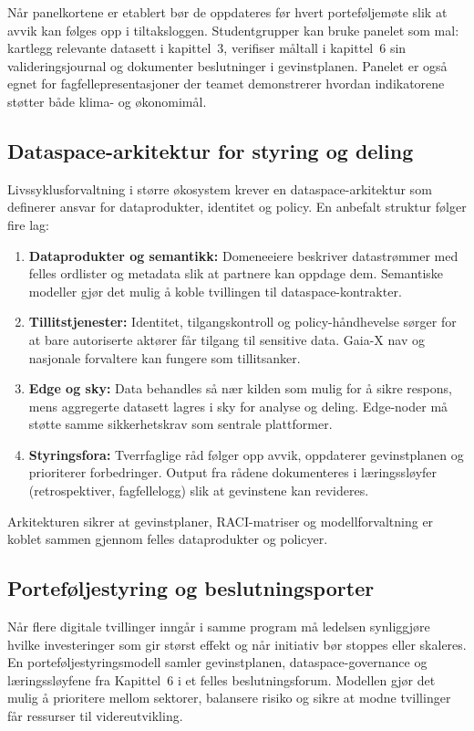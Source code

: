 Når panelkortene er etablert bør de oppdateres før hvert porteføljemøte slik at avvik kan følges opp i tiltaksloggen. Studentgrupper kan bruke panelet som mal: kartlegg relevante datasett i kapittel~3, verifiser måltall i kapittel~6 sin valideringsjournal og dokumenter beslutninger i gevinstplanen. Panelet er også egnet for fagfellepresentasjoner der teamet demonstrerer hvordan indikatorene støtter både klima- og økonomimål.

\subsection*{Dataspace-arkitektur for styring og deling}
Livssyklusforvaltning i større økosystem krever en dataspace-arkitektur som definerer ansvar for dataprodukter, identitet og policy. En anbefalt struktur følger fire lag:
\begin{enumerate}
    \item \textbf{Dataprodukter og semantikk:} Domeneeiere beskriver datastrømmer med felles ordlister og metadata slik at partnere kan oppdage dem. Semantiske modeller gjør det mulig å koble tvillingen til dataspace-kontrakter.\citep{idsa2023ram}
    \item \textbf{Tillitstjenester:} Identitet, tilgangskontroll og policy-håndhevelse sørger for at bare autoriserte aktører får tilgang til sensitive data. Gaia-X nav og nasjonale forvaltere kan fungere som tillitsanker.\citep{gaiax2023architecture}
    \item \textbf{Edge og sky:} Data behandles så nær kilden som mulig for å sikre respons, mens aggregerte datasett lagres i sky for analyse og deling. Edge-noder må støtte samme sikkerhetskrav som sentrale plattformer.\citep{etsi2023mec}
    \item \textbf{Styringsfora:} Tverrfaglige råd følger opp avvik, oppdaterer gevinstplanen og prioriterer forbedringer. Output fra rådene dokumenteres i læringssløyfer (retrospektiver, fagfellelogg) slik at gevinstene kan revideres.
\end{enumerate}
Arkitekturen sikrer at gevinstplaner, RACI-matriser og modellforvaltning er koblet sammen gjennom felles dataprodukter og policyer.

\subsection*{Porteføljestyring og beslutningsporter}
Når flere digitale tvillinger inngår i samme program må ledelsen synliggjøre hvilke investeringer som gir størst effekt og når initiativ bør stoppes eller skaleres. En porteføljestyringsmodell samler gevinstplanen, dataspace-governance og læringssløyfene fra Kapittel~6 i et felles beslutningsforum.\citep{digdir2022gevinst,rcn2024digitalisering} Modellen gjør det mulig å prioritere mellom sektorer, balansere risiko og sikre at modne tvillinger får ressurser til videreutvikling.


